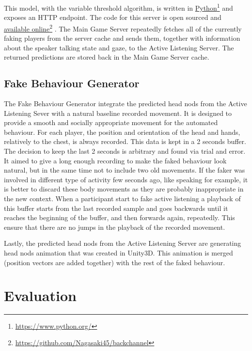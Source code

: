 \documentclass[]{simple-thesis}
\newcommand\fnurl[2]{%
  \href{#2}{#1}\footnote{\url{#2}}%
}
\begin{document}
This model, with the variable threshold algorithm, is written in \fnurl{Python}{https://www.python.org/} and exposes an HTTP endpoint.
The code for this server is open sourced and \fnurl{available online}{https://github.com/Nagasaki45/backchannel}.
The Main Game Server repeatedly fetches all of the currently faking players from the server cache and sends them, together with information about the speaker talking state and gaze, to the Active Listening Server.
The returned predictions are stored back in the Main Game Server cache.

\section{Fake Behaviour Generator}\label{system:fake_behaviour_generator}

The Fake Behaviour Generator integrate the predicted head nods from the Active Listening Sever with a natural baseline recorded movement.
It is designed to provide a smooth and socially appropriate movement for the automated behaviour.
For each player, the position and orientation of the head and hands, relatively to the chest, is always recorded.
This data is kept in a 2 seconds buffer.
The decision to keep the last 2 seconds is arbitrary and found via trial and error.
It aimed to give a long enough recording to make the faked behaviour look natural, but in the same time not to include two old movements.
If the faker was involved in different type of activity few seconds ago, like speaking for example, it is better to discard these body movements as they are probably inappropriate in the new context.
When a participant start to fake active listening a playback of this buffer starts from the last recorded sample and goes backwards until it reaches the beginning of the buffer, and then forwards again, repeatedly.
This ensure that there are no jumps in the playback of the recorded movement.

Lastly, the predicted head nods from the Active Listening Server are generating head nods animation that was created in Unity3D.
This animation is merged (position vectors are added together) with the rest of the faked behaviour.


\chapter{Evaluation}\label{evaluation}
\end{document}
